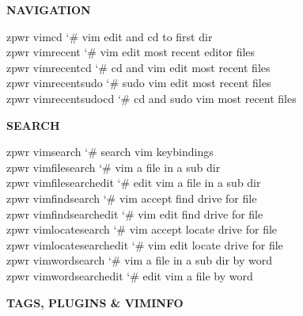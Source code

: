 \documentclass[11pt,a4paper,twoside]{book}
\begin{document}
\vspace{12pt}
{\bfseries\color{neonyellow} NAVIGATION}\vspace{4pt}

\begin{codebox}
\color{neongreen}zpwr vimcd                 {\char`\#} vim edit and cd to first dir\\
\color{neongreen}zpwr vimrecent             {\char`\#} vim edit most recent editor files\\
\color{neongreen}zpwr vimrecentcd           {\char`\#} cd and vim edit most recent files\\
\color{neongreen}zpwr vimrecentsudo         {\char`\#} sudo vim edit most recent files\\
\color{neongreen}zpwr vimrecentsudocd       {\char`\#} cd and sudo vim most recent files\\
\end{codebox}


\vspace{12pt}
{\bfseries\color{neonyellow} SEARCH}\vspace{4pt}

\begin{codebox}
\color{neongreen}zpwr vimsearch             {\char`\#} search vim keybindings\\
\color{neongreen}zpwr vimfilesearch         {\char`\#} vim a file in a sub dir\\
\color{neongreen}zpwr vimfilesearchedit     {\char`\#} edit vim a file in a sub dir\\
\color{neongreen}zpwr vimfindsearch         {\char`\#} vim accept find drive for file\\
\color{neongreen}zpwr vimfindsearchedit     {\char`\#} vim edit find drive for file\\
\color{neongreen}zpwr vimlocatesearch       {\char`\#} vim accept locate drive for file\\
\color{neongreen}zpwr vimlocatesearchedit   {\char`\#} vim edit locate drive for file\\
\color{neongreen}zpwr vimwordsearch         {\char`\#} vim a file in a sub dir by word\\
\color{neongreen}zpwr vimwordsearchedit     {\char`\#} edit vim a file by word\\
\end{codebox}


\vspace{12pt}
{\bfseries\color{neonyellow} TAGS, PLUGINS \& VIMINFO}\vspace{4pt}
\end{document}
